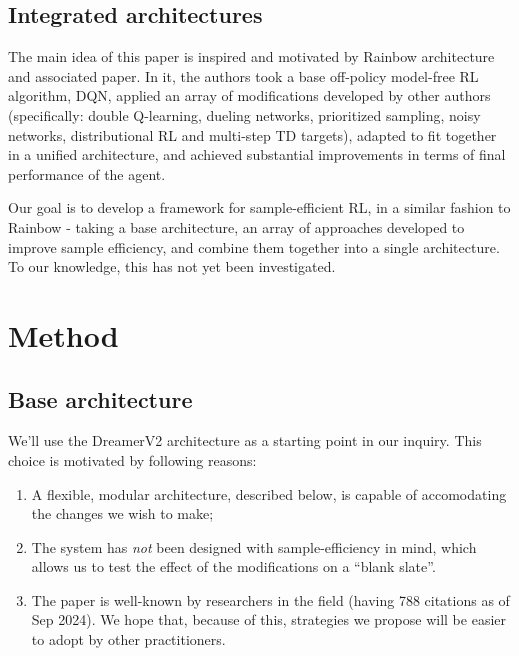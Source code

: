 \documentclass[twoside,11pt]{article}
\begin{document}
\subsection{Integrated architectures}

The main idea of this paper is inspired and motivated by Rainbow architecture and associated paper. In it, the authors took a base off-policy model-free RL algorithm, DQN, applied an array of modifications developed by other authors (specifically: double Q-learning, dueling networks, prioritized sampling, noisy networks, distributional RL and multi-step TD targets), adapted to fit together in a unified architecture, and achieved substantial improvements in terms of final performance of the agent.

Our goal is to develop a framework for sample-efficient RL, in a similar fashion to Rainbow - taking a base architecture, an array of approaches developed to improve sample efficiency, and combine them together into a single architecture. To our knowledge, this has not yet been investigated.

\section{Method}

\subsection{Base architecture}

We'll use the DreamerV2 architecture as a starting point in our inquiry. This choice is motivated by following reasons:

\begin{enumerate}
  \item A flexible, modular architecture, described below, is capable of accomodating the changes we wish to make;
  \item The system has \emph{not} been designed with sample-efficiency in mind, which allows us to test the effect of the modifications on a ``blank slate''.
  \item The paper is well-known by researchers in the field (having 788 citations as of Sep 2024). We hope that, because of this, strategies we propose will be easier to adopt by other practitioners.
\end{enumerate}
\end{document}
